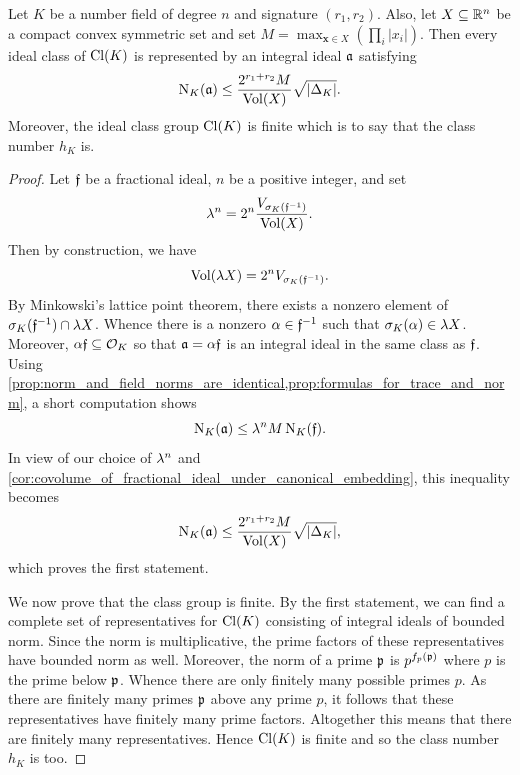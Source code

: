     \begin{theorem}\label{equ:finitness_of_class_number}
      Let \(K\) be a number field of degree \(n\) and signature \((r_{1},r_{2})\). Also, let \(X \subseteq \mathbb{R}^{n}\) be a compact convex symmetric set and set \(M = \max_{\mathbf{x} \in X}\left(\prod_{i}|x_{i}|\right)\). Then every ideal class of \(\operatorname{\mathrm{Cl}}(K)\) is represented by an integral ideal \(\mathfrak{a}\) satisfying
      \[
        \operatorname{\mathrm{N}}_{K}(\mathfrak{a}) \le \frac{2^{r_{1}+r_{2}}M}{\operatorname{\mathrm{Vol}}(X)}\sqrt{|\Delta_{K}|}.
      \]
      Moreover, the ideal class group \(\operatorname{\mathrm{Cl}}(K)\) is finite which is to say that the class number \(h_{K}\) is.
    \end{theorem}
    \begin{proof}
      Let \(\mathfrak{f}\) be a fractional ideal, \(n\) be a positive integer, and set
      \[
        \lambda^{n} = 2^{n}\frac{V_{\sigma_{K}(\mathfrak{f}^{-1})}}{\operatorname{\mathrm{Vol}}(X)}.
      \]
      Then by construction, we have
      \[
        \operatorname{\mathrm{Vol}}(\lambda X) = 2^{n}V_{\sigma_{K}(\mathfrak{f}^{-1})}.
      \]
      By Minkowski's lattice point theorem, there exists a nonzero element of \(\sigma_{K}(\mathfrak{f}^{-1}) \cap \lambda X\). Whence there is a nonzero \(\alpha \in \mathfrak{f}^{-1}\) such that \(\sigma_{K}(\alpha) \in \lambda X\). Moreover, \(\alpha\mathfrak{f} \subseteq \mathcal{O}_{K}\) so that \(\mathfrak{a} = \alpha\mathfrak{f}\) is an integral ideal in the same class as \(\mathfrak{f}\). Using \cref{prop:norm_and_field_norms_are_identical,prop:formulas_for_trace_and_norm}, a short computation shows
      \[
        \operatorname{\mathrm{N}}_{K}(\mathfrak{a}) \le \lambda^{n}M\operatorname{\mathrm{N}}_{K}(\mathfrak{f}).
      \]
      In view of our choice of \(\lambda^{n}\) and \cref{cor:covolume_of_fractional_ideal_under_canonical_embedding}, this inequality becomes
      \[
        \operatorname{\mathrm{N}}_{K}(\mathfrak{a}) \le \frac{2^{r_{1}+r_{2}}M}{\operatorname{\mathrm{Vol}}(X)}\sqrt{|\Delta_{K}|},
      \]
      which proves the first statement.
      
      We now prove that the class group is finite. By the first statement, we can find a complete set of representatives for \(\operatorname{\mathrm{Cl}}(K)\) consisting of integral ideals of bounded norm. Since the norm is multiplicative, the prime factors of these representatives have bounded norm as well. Moreover, the norm of a prime \(\mathfrak{p}\) is \(p^{f_{p}(\mathfrak{p})}\) where \(p\) is the prime below \(\mathfrak{p}\). Whence there are only finitely many possible primes \(p\). As there are finitely many primes \(\mathfrak{p}\) above any prime \(p\), it follows that these representatives have finitely many prime factors. Altogether this means that there are finitely many representatives. Hence \(\operatorname{\mathrm{Cl}}(K)\) is finite and so the class number \(h_{K}\) is too.
    \end{proof}

